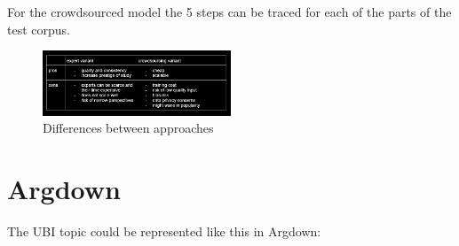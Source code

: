 \documentclass{report}
\begin{document}
For the crowdsourced model the 5 steps can be traced for each of the parts of the test corpus. 
\begin{figure}[h]
    \centering
    \includegraphics[width=0.5\textwidth]{../good-data/experts-vs-crowdsource.png}
    \caption{Differences between approaches}
    \label{fig:example}
\end{figure}


\section{Argdown}

The UBI topic could be represented like this in Argdown:
\end{document}
